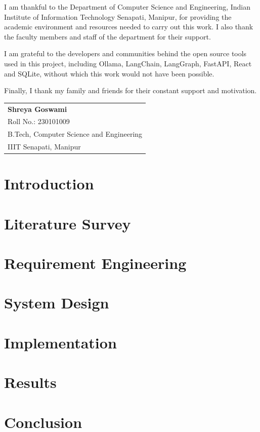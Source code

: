 \documentclass[a4paper, 11pt, oneside]{report}
\begin{document}
	I am thankful to the Department of Computer Science and Engineering, Indian Institute of Information Technology Senapati, Manipur, for providing the academic environment and resources needed to carry out this work. I also thank the faculty members and staff of the department for their support.

	I am grateful to the developers and communities behind the open source tools used in this project, including Ollama, LangChain, LangGraph, FastAPI, React and SQLite, without which this work would not have been possible.

	Finally, I thank my family and friends for their constant support and motivation.

	\vspace{2cm}
	\noindent\hfill\begin{tabular}{l}
		\textbf{Shreya Goswami} \\
		Roll No.: 230101009 \\
		B.Tech, Computer Science and Engineering \\
		IIIT Senapati, Manipur
	\end{tabular}

	\tableofcontents
	\listoffigures
        \listoftables
	\chapter{Introduction}
	
        \chapter{Literature Survey}
        
        \chapter{Requirement Engineering}
        
        \chapter{System Design}
        
        \chapter{Implementation}
        
        \chapter{Results}
        
        \chapter{Conclusion}
        

        
	
\end{document}
